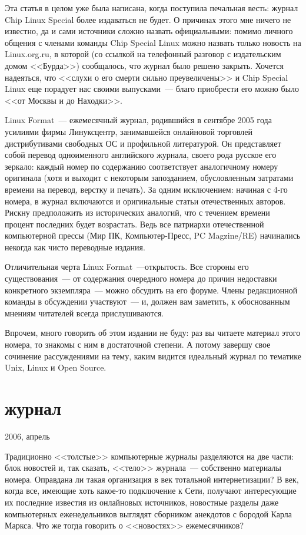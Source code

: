Эта статья в целом уже была написана, когда поступила печальная весть: журнал Chip Linux Special более издаваться не будет. О причинах этого мне ничего не известно, да и сами источники сложно назвать официальными: помимо личного общения с членами команды Chip Special Linux можно назвать только новость на Linux.org.ru, в которой (со ссылкой на телефонный разговор с издательским домом <<Бурда>>) сообщалось, что журнал было решено закрыть. Хочется надеяться, что <<слухи о его смерти сильно преувеличены>> и Chip Special Linux еще порадует нас своими выпусками~--- благо приобрести его можно было <<от Москвы и до Находки>>.

Linux Format~--- ежемесячный журнал, родившийся в сентябре 2005 года усилиями фирмы Линуксцентр, занимавшейся онлайновой торговлей дистрибутивами свободных ОС и профильной литературой. Он представляет собой перевод одноименного английского журнала, своего рода русское его зеркало: каждый номер по содержанию соответствует аналогичному номеру оригинала (хотя и выходит с некоторым запозданием, обусловленным затратами времени на перевод, верстку и печать). За одним исключением: начиная с 4-го номера, в журнал включаются и оригинальные статьи отечественных авторов. Рискну предположить из исторических аналогий, что с течением времени процент последних будет возрастать. Ведь все патриархи отечественной компьютерной прессы (Мир ПК, Компьютер-Пресс, PC Magzine/RE) начинались некогда как чисто переводные издания.

Отличительная черта Linux Format~---открытость. Все стороны его существования~--- от содержания очередного номера до причин недоставки конкретного экземпляра~--- можно обсудить на его форуме. Члены редакционной команды в обсуждении участвуют~--- и, должен вам заметить, к обоснованным мнениям читателей всегда прислушиваются.

Впрочем, много говорить об этом издании не буду: раз вы читаете материал этого номера, то знакомы с ним в достаточной степени. А потому завершу свое сочинение рассуждениями на тему, каким видится идеальный журнал по тематике Unix, Linux и Open Source.

\section{ журнал} 
\begin{timeline}2006, апрель\end{timeline}

Традиционно <<толстые>> компьютерные журналы разделяются на две части: блок новостей и, так сказать, <<тело>> журнала~--- собственно материалы номера. Оправдана ли такая организация в век тотальной интернетизации? В век, когда все, имеющие хоть какое-то подключение к Сети, получают интересующие их последние известия из онлайновых источников, новостные разделы даже компьютерных еженедельников выглядят сборником анекдотов с бородой Карла Маркса. Что же тогда говорить о <<новостях>> ежемесячников?


